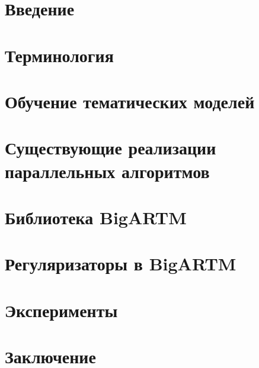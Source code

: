 \documentclass[12pt]{article}
\begin{document}
\tableofcontents
\newpage

\section{Введение}\label{introduction}


\section{Терминология}\label{defenitions}


\section{Обучение тематических моделей}\label{learning}


\section{Существующие реализации параллельных алгоритмов}\label{overview}


\section{Библиотека BigARTM}\label{library}


\section{Регуляризаторы в BigARTM}\label{regularizers}


\section{Эксперименты}\label{experiments}


\section{Заключение}\label{results}

\end{document}
